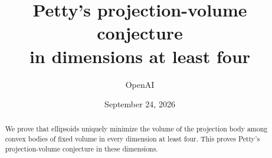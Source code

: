 \documentclass[11pt]{article}
\title{Petty's projection-volume conjecture\\
in dimensions at least four}
\author{OpenAI}
\date{September 24, 2026}
\theoremstyle{definition}
\theoremstyle{remark}
\begin{document}
\maketitle
\begin{abstract}
We prove that ellipsoids uniquely minimize the volume of the projection body
among convex bodies of fixed volume in every dimension at least four.
This proves Petty's projection-volume conjecture in these dimensions.
\end{abstract}








\end{document}
